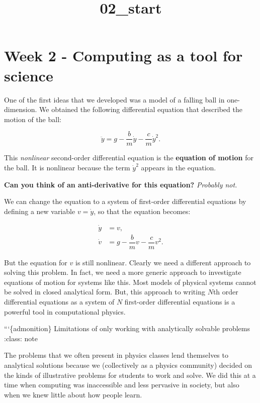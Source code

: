 \documentclass[11pt]{article}
\title{02\_start}
\begin{document}
    
    \maketitle
    
    

    
    \section{Week 2 - Computing as a tool for
science}\label{week-2---computing-as-a-tool-for-science}

    One of the first ideas that we developed was a model of a falling ball
in one-dimension. We obtained the following differential equation that
described the motion of the ball:

\[\ddot{y} = g - \dfrac{b}{m}\dot{y} - \dfrac{c}{m}\dot{y}^2.\]

This \emph{nonlinear} second-order differential equation is the
\textbf{equation of motion} for the ball. It is nonlinear because the
term \(\dot{y}^2\) appears in the equation.

\textbf{Can you think of an anti-derivative for this equation?}
\emph{Probably not.}

We can change the equation to a system of first-order differential
equations by defining a new variable \(v = \dot{y}\), so that the
equation becomes:

\[\begin{aligned}
\dot{y} &= v, \\
\dot{v} &= g - \dfrac{b}{m}v - \dfrac{c}{m}v^2.
\end{aligned}\]

But the equation for \(v\) is still nonlinear. Clearly we need a
different approach to solving this problem. In fact, we need a more
generic approach to investigate equations of motion for systems like
this. Most models of physical systems cannot be solved in closed
analytical form. But, this approach to writing \(N\)th order
differential equations as a system of \(N\) first-order differential
equations is a powerful tool in computational physics.

    ```\{admonition\} Limitations of only working with analytically solvable
problems :class: note

The problems that we often present in physics classes lend themselves to
analytical solutions because we (collectively as a physics community)
decided on the kinds of illustrative problems for students to work and
solve. We did this at a time when computing was inaccessible and less
pervasive in society, but also when we knew little about how people
learn.
\end{document}
